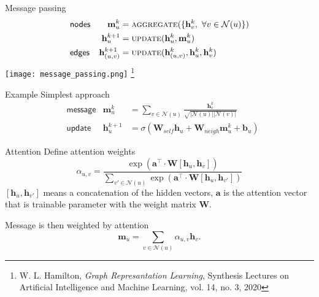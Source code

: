 \documentclass{beamer}
\begin{document}
\begin{frame}{Message passing}
    \begin{align*}
        &\textsf{nodes}& \mathbf{m}_u^k &= \textsc{aggregate}(\{\mathbf{h}_v^k,\ \forall v\in\mathcal{N}(u)\}) \\
        & & \mathbf{h}_u^{k+1} &= \textsc{update}(\mathbf{h}_u^k, \mathbf{m}_u^k) \\
        &\textsf{edges}& \mathbf{h}_{(u,v)}^{k+1} &= \textsc{update}(\mathbf{h}_{(u,v)}^k, \mathbf{h}_u^k, \mathbf{h}_v^k)
    \end{align*}
    \texttt{[image: message\_passing.png]}
    \let\thefootnote\relax\footnote{W. L. Hamilton, \textit{Graph Represantation Learning}, Synthesis Lectures on Artificial Intelligence and Machine Learning, vol. 14, no. 3, 2020}
\end{frame}

\begin{frame}{Example}
    Simplest approach
    \begin{align*}
        &\textsf{message}& \mathbf{m}_u^k &= \sum_{v\in\mathcal{N}(u)} \frac{\mathbf{h}_v^k}{\sqrt{ |\mathcal{N}(u)| |\mathcal{N}(v)| }} \\
        &\textsf{update}& \mathbf{h}_u^{k+1} &= \sigma \left( \mathbf{W}_{self} \mathbf{h}_u + \mathbf{W}_{neigh}\mathbf{m}_u^k + \mathbf{b}_u \right)
    \end{align*}

\end{frame}

\begin{frame}{Attention}
    Define attention weights
    \begin{equation*}
        \alpha_{u, v} = \frac{\exp(\mathbf{a}^\intercal \cdot \mathbf{W}[\mathbf{h}_u, \mathbf{h}_v])}
        {\sum_{v'\in\mathcal{N}(u)} \exp(\mathbf{a}^\intercal \cdot \mathbf{W}[\mathbf{h}_u, \mathbf{h}_{v'}])}
    \end{equation*}
    $[\mathbf{h}_u, \mathbf{h}_{v'}]$ means a concatenation of the hidden vectors, $\mathbf{a}$ is the attention vector that is trainable parameter with the weight matrix $\mathbf{W}$.

    Message is then weighted by attention
    \begin{equation*}
        \mathbf{m}_u = \sum_{v\in\mathcal{N}(u)} \alpha_{u,v}\mathbf{h}_v.
    \end{equation*}

\end{frame}
\end{document}
